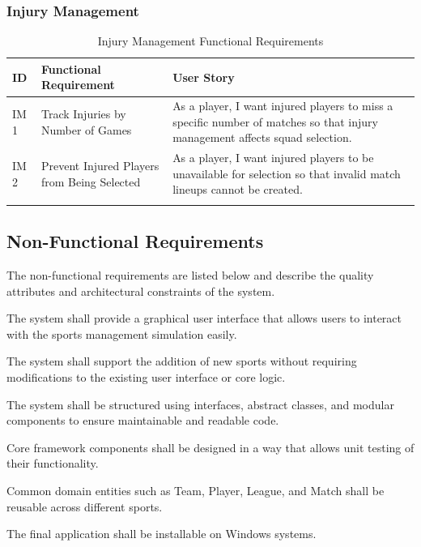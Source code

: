 \documentclass[12pt, a4paper]{article}
\begin{document}
\subsubsection*{Injury Management}

\begin{longtable}{L{1.4cm} L{2.8cm} L{8.5cm}}
\toprule
\textbf{ID} & \textbf{Functional Requirement} & \textbf{User Story} \\
\midrule
\endhead
IM 1 & Track Injuries by Number of Games &
    As a player, I want injured players to miss a specific number of matches so that injury management affects squad selection. \\[0.4em]
IM 2 & Prevent Injured Players from Being Selected &
    As a player, I want injured players to be unavailable for selection so that invalid match lineups cannot be created. \\
\bottomrule
\caption{Injury Management Functional Requirements}
\end{longtable}

\subsection{Non-Functional Requirements}

The non-functional requirements are listed below and describe the quality attributes and
architectural constraints of the system.

\begin{description}[leftmargin=2em, labelwidth=2em]
    \item[\textbf{NFR 01} -- Graphical User Interface:]
        The system shall provide a graphical user interface that allows users to interact with the sports management simulation easily.
    \item[\textbf{NFR 02} -- Extensibility:]
        The system shall support the addition of new sports without requiring modifications to the existing user interface or core logic.
    \item[\textbf{NFR 03} -- Maintainability:]
        The system shall be structured using interfaces, abstract classes, and modular components to ensure maintainable and readable code.
    \item[\textbf{NFR 04} -- Testability:]
        Core framework components shall be designed in a way that allows unit testing of their functionality.
    \item[\textbf{NFR 05} -- Reusability:]
        Common domain entities such as Team, Player, League, and Match shall be reusable across different sports.
    \item[\textbf{NFR 06} -- Installability:]
        The final application shall be installable on Windows systems.
\end{description}
\end{document}
